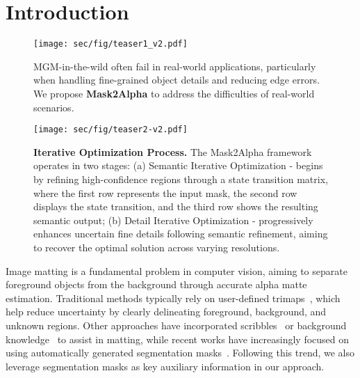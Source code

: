 \section{Introduction}
\label{sec:intro}
\begin{figure}[t]
    \centering
    \texttt{[image: sec/fig/teaser1\_v2.pdf]}
    \caption {MGM-in-the-wild\cite{park2023mgmwild} often fail in real-world applications, particularly when handling fine-grained object details and reducing edge errors. We propose \textbf{Mask2Alpha} to address the difficulties of real-world scenarios.}
    \label{fig:teaser}
\end{figure}

\begin{figure*}[t]
    \centering \texttt{[image: sec/fig/teaser2-v2.pdf]}
    \caption{\textbf{Iterative Optimization Process.} The Mask2Alpha framework operates in two stages: (a) Semantic Iterative Optimization - begins by refining high-confidence regions through a state transition matrix, where the first row represents the input mask, the second row displays the state transition, and the third row shows the resulting semantic output; (b) Detail Iterative Optimization - progressively enhances uncertain fine details following semantic refinement, aiming to recover the optimal solution across varying resolutions.}
    \label{fig:iterate}
\end{figure*}


Image matting is a fundamental problem in computer vision, aiming to separate foreground objects from the background through accurate alpha matte estimation. Traditional methods typically rely on user-defined trimaps~\cite{wang2007optimized, Sun2004PoissonM, aksoy2017designing}, which help reduce uncertainty by clearly delineating foreground, background, and unknown regions. Other approaches have incorporated scribbles~\cite{zheng2008fuzzymatte, wang2005iterative} or background knowledge~\cite{backgroundmatting, backgroundmattingv2} to assist in matting, while recent works have increasingly focused on using automatically generated segmentation masks~\cite{park2023mgmwild, yu2021mgm, huynh2024maggie}. Following this trend, we also leverage segmentation masks as key auxiliary information in our approach. 

